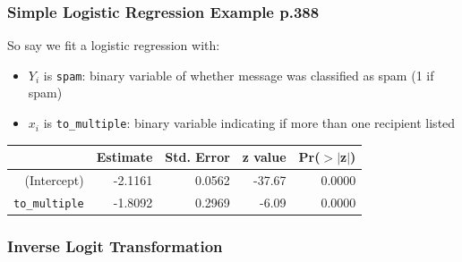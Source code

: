 \documentclass[slides]{beamer}
\newcommand{\blue}[1]{\textcolor{blue2}{#1}}
\begin{document}
\begin{frame}[fragile]
\frametitle{Simple Logistic Regression Example p.388}

So say we fit a logistic regression with:
\begin{itemize}
\item $Y_i$ is {\tt spam}:  binary variable of whether message was classified as spam (1 if spam)
\pause\item $x_i$ is {\tt to\_multiple}:  binary variable indicating if more than one recipient listed
\end{itemize}
\pause
\begin{table}[ht]
\centering
\begin{tabular}{r|rrrr}
  \hline
 & Estimate & Std. Error & z value & Pr($>$$|$z$|$) \\ 
  \hline
(Intercept) & -2.1161 & 0.0562 & -37.67 & 0.0000 \\ 
  {\tt to\_multiple} & -1.8092 & 0.2969 & -6.09 & 0.0000 \\ 
   \hline
\end{tabular}
\end{table}

%
%

\end{frame}


\begin{frame}[fragile]
\frametitle{Inverse Logit Transformation}
%
%
%
%


\end{frame}
\end{document}
